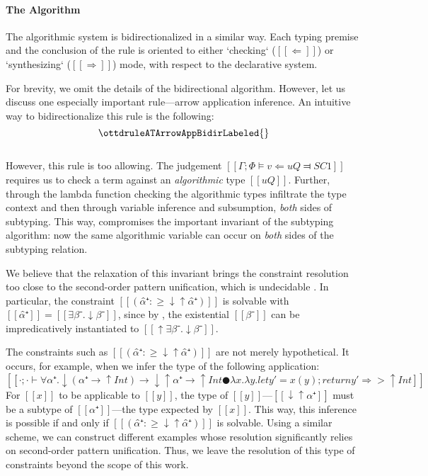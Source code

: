 \paragraph{The Algorithm}

    The algorithmic system is bidirectionalized in a similar way. 
    Each typing premise and the conclusion of the rule is oriented
    to either `checking` ($[[⇐]]$) or `synthesizing` ($[[⇒]]$) mode,
    with respect to the declarative system. 
 
    For brevity, we omit the details of the bidirectional algorithm.
    However, let us discuss one especially important rule---arrow application inference. 
    An intuitive way to bidirectionalize this rule is the following:
    $$ \ottdruleATArrowAppBidirLabeled{} $$\\
    However, this rule is too allowing. 
    The judgement $[[Γ ; Φ ⊨ v ⇐ uQ ⫤ SC1]]$
    requires us to check a term against an \emph{algorithmic} 
    type $[[uQ]]$. Further, through the
    lambda function checking 
    the algorithmic types infiltrate the type context
    and then through variable inference and subsumption, 
    \emph{both} sides of subtyping. 
    This way, 
    compromises the important invariant
    of the subtyping algorithm: 
    now the same algorithmic variable can occur on \emph{both}
     sides of the subtyping relation.

    We believe that the relaxation of this invariant brings the 
    constraint resolution too close to the second-order pattern 
    unification, which is undecidable \cite{goldfarb81:undecidability}.
    In particular, the constraint $[[(α̂⁺ :≥ ↓↑α̂⁺)]]$ is solvable with 
    $[[α̂⁺]] = [[∃β⁻.↓β⁻]]$, 
    since by , 
    the existential $[[β⁻]]$ can be impredicatively instantiated to $[[↑∃β⁻.↓β⁻]]$. 

    The constraints such as $[[(α̂⁺ :≥ ↓↑α̂⁺)]]$ are not merely hypothetical. 
    It occurs, for example, when we infer the type of the following application:
    $$[[· ; · ⊢ ∀α⁺ . ↓(α⁺ → ↑Int) → ↓↑α⁺ → ↑Int ● {λx.λy.let y' = x(y); return y'} ⇒> ↑Int]]$$
    For $[[x]]$ to be applicable to $[[y]]$,
    the type of $[[y]]$---$[[↓↑α⁺]]$ must be a subtype of
    $[[α⁺]]$---the type expected by $[[x]]$. This way, 
    this inference is possible if and only if
    $[[(α̂⁺ :≥ ↓↑α̂⁺)]]$ is solvable.
    Using a similar scheme, we can construct different examples
    whose resolution significantly relies on second-order pattern unification.
    Thus, we leave the resolution of this type of constraints beyond the scope of this work.

